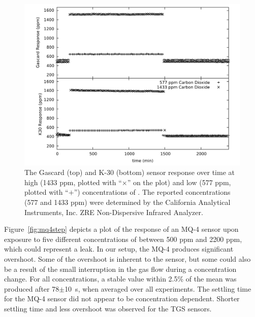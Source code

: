 \documentclass[sensors,article,submit,moreauthors,pdftex]{Definitions/mdpi}
\begin{document}
			\begin{figure}[!t]
				\centering
				\includegraphics[width=\columnwidth]{honey3.pdf}
				\caption{The Gascard (top) and K-30 (bottom) sensor response over time at high (1433 ppm, plotted with ``$\times$'' on the plot) and low (577 ppm, plotted with ``$+$'') concentrations of .
				The reported concentrations (577 and 1433 ppm) were determined by the California Analytical Instruments, Inc. ZRE Non-Dispersive Infrared Analyzer.}
				\label{fig:peakdetailco2}
			\end{figure}
			
			Figure~\ref{fig:mq4step} depicts a plot of the response of an MQ-4 sensor upon exposure to five different concentrations of  between 500 ppm and 2200 ppm, which could represent a  leak.
			In our setup, the MQ-4 produces significant overshoot.
			Some of the overshoot is inherent to the sensor, but some could also be a result of the small interruption in the gas flow during a concentration change.
			For all concentrations, a stable value within 2.5\% of the mean was produced after 78$\pm$\SI{10}{\second}, when averaged over all experiments.
			The settling time for the MQ-4 sensor did not appear to be concentration dependent. Shorter settling time and less overshoot was observed for the TGS sensors.
			
\end{document}
